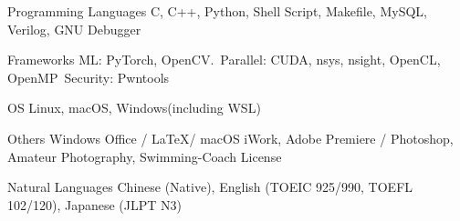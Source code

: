 

\begin{cvskills}

  \cvskill
    {Programming Languages} %
    {C, C++, Python, Shell Script, Makefile, MySQL, Verilog,  GNU Debugger} %

  \cvskill
    {Frameworks} %
    {ML: PyTorch, OpenCV.\ Parallel: CUDA, nsys, nsight, OpenCL, OpenMP\ Security: Pwntools} %

  \cvskill
    {OS} %
    {Linux, macOS, Windows(including WSL)} %

  \cvskill
    {Others} %
    {Windows Office / \LaTeX / macOS iWork, Adobe Premiere / Photoshop, Amateur Photography, Swimming-Coach License} %

  \cvskill
    {Natural Languages} %
    {Chinese (Native), English (TOEIC 925/990, TOEFL 102/120), Japanese (JLPT N3)} %

\end{cvskills}
